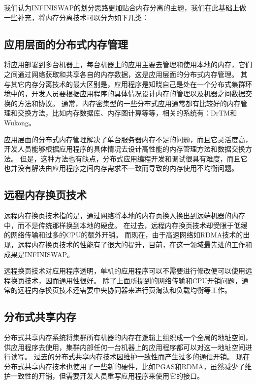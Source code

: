 我们认为INFINISWAP的划分思路更加贴合内存分离的主题，我们在此基础上做一些补充，将内存分离技术可以分为如下几类：

\subsection{应用层面的分布式内存管理}

将应用部署到多台机器上，每台机器上的应用主要去管理和使用本地的内存，它们之间通过网络获取和共享各自的内存数据，这是应用层面的分布式内存管理。
其与其它内存分离技术的最大区别是，应用程序是知晓自己是处在一个分布式集群环境中的，开发人员要根据应用程序的具体情况设计内存的管理以及机器之间数据交换的方法和协议。
通常，内存密集型的一些分布式应用通常都有比较好的内存管理和交换方法，比如内存数据库、内存图计算等等，相关的系统有：DrTM\cite{wei2015fast}和Wukong\cite{shi2016fast}。

应用层面的分布式内存管理解决了单台服务器内存不足的问题，而且它灵活度高，开发人员能够根据应用程序的具体情况去设计高性能的内存管理方法和数据交换方法。
但是，这种方法也有缺点，分布式应用编程开发和调试很具有难度，而且它也并没有解决由应用程序之间内存需求不一致而导致的内存使用不均衡问题。

\subsection{远程内存换页技术}
远程内存换页技术指的是，通过网络将本地的内存页换入换出到远端机器的内存中，而不是传统那样换到本地的硬盘\cite{chen2008transparent,newhall2003nswap,flouris1999network}。
在过去，远程内存换页技术却受限于低缓的网络传输和过多的CPU的额外开销。
而现在，由于高速网络如RDMA技术的出现，远程内存换页技术的性能有了很大的提升，目前，在这一领域最先进的工作和成果是INFINISWAP\cite{gu2017efficient}。

远程换页技术对应用程序透明，单机的应用程序可以不需要进行修改便可以使用远程换页技术，因而通用性很好。
除了上面所提到的网络传输和CPU开销问题，通常的远程内存换页技术还需要中央协同器来进行页淘汰和负载均衡等工作。

\subsection{分布式共享内存}
分布式共享内存系统将集群所有机器的内存在逻辑上组织成一个全局的地址空间，供应用程序去使用，集群内部任何一台机器上的应用程序都可以对这一地址空间进行读写\cite{carter1991implementation,li1989memory,nitzberg1991distributed}。
过去的分布式共享内存技术因维护一致性而产生过多的通信开销。
现在分布式共享内存技术也使用了一些新的硬件，比如PGAS和RDMA，虽然减少了维护一致性的开销，但需要开发人员重写应用程序来使用它的接口。

